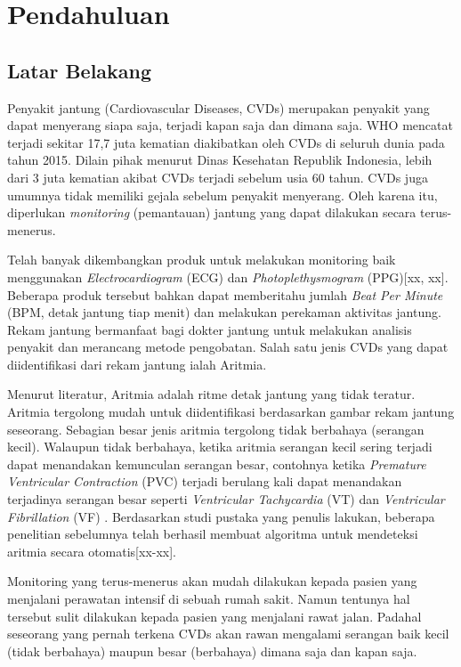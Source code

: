 \chapter{Pendahuluan}
\section{Latar Belakang}
Penyakit jantung (Cardiovascular Diseases, CVDs) merupakan penyakit yang dapat menyerang siapa saja, terjadi kapan saja dan dimana saja. WHO mencatat terjadi sekitar 17,7 juta kematian diakibatkan oleh CVDs di seluruh dunia pada tahun 2015\cite{who2015facts}. Dilain pihak menurut Dinas Kesehatan Republik Indonesia, lebih dari 3 juta kematian akibat CVDs terjadi sebelum usia 60 tahun\cite{depkes2014}. CVDs juga umumnya tidak memiliki gejala sebelum penyakit menyerang\cite{who2015facts}. Oleh karena itu, diperlukan \textit{monitoring} (pemantauan) jantung yang dapat dilakukan secara terus-menerus.

Telah banyak dikembangkan produk untuk melakukan monitoring baik menggunakan \textit{Electrocardiogram} (ECG) dan \textit{Photoplethysmogram} (PPG)[xx, xx]. Beberapa produk tersebut bahkan dapat memberitahu jumlah \textit{Beat Per Minute} (BPM, detak jantung tiap menit) dan melakukan perekaman aktivitas jantung. Rekam jantung bermanfaat bagi dokter jantung untuk melakukan analisis penyakit dan merancang metode pengobatan. Salah satu jenis CVDs yang dapat diidentifikasi dari rekam jantung ialah Aritmia.

Menurut literatur, Aritmia adalah ritme detak jantung yang tidak teratur\cite{cvd_is}. Aritmia tergolong mudah untuk diidentifikasi berdasarkan gambar rekam jantung seseorang. Sebagian besar jenis aritmia tergolong tidak berbahaya (serangan kecil)\cite{arrhythmia_is}. Walaupun tidak berbahaya, ketika aritmia serangan kecil sering terjadi dapat menandakan kemunculan serangan besar, contohnya ketika \textit{Premature Ventricular Contraction} (PVC) terjadi berulang kali dapat menandakan terjadinya serangan besar seperti \textit{Ventricular Tachycardia} (VT) dan \textit{Ventricular Fibrillation} (VF) \cite{rr_classification}. Berdasarkan studi pustaka yang penulis lakukan, beberapa penelitian sebelumnya telah berhasil membuat algoritma untuk mendeteksi aritmia secara otomatis[xx-xx].

Monitoring yang terus-menerus akan mudah dilakukan kepada pasien yang menjalani perawatan intensif di sebuah rumah sakit. Namun tentunya hal tersebut sulit dilakukan kepada pasien yang menjalani rawat jalan. Padahal seseorang yang pernah terkena CVDs akan rawan mengalami serangan baik kecil (tidak berbahaya) maupun besar (berbahaya) dimana saja dan kapan saja.

